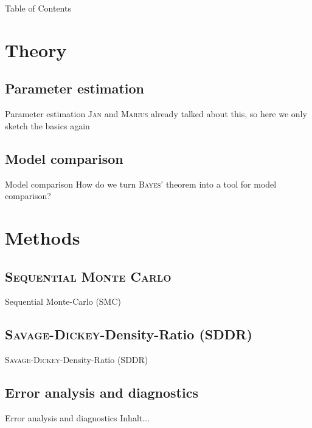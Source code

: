 \documentclass[11pt,aspectratio=1610,dvipsnames]{beamer}
\begin{document}
\begin{frame}{Table of Contents}
	\tableofcontents
\end{frame}

\section{Theory}
\subsection{Parameter estimation}
\begin{frame}{Parameter estimation}
	\textsc{Jan} and \textsc{Marius} already talked about this, so here we only sketch the basics again
\end{frame}

\subsection{Model comparison}
\begin{frame}{Model comparison}
	How do we turn \textsc{Bayes'} theorem into a tool for model comparison?
\end{frame}

\section{Methods}

\subsection{\textsc{Sequential Monte Carlo}}
\begin{frame}{Sequential Monte-Carlo (SMC)}
\end{frame}

\subsection{\textsc{Savage-Dickey}-Density-Ratio (SDDR)}
\begin{frame}{\textsc{Savage-Dickey}-Density-Ratio (SDDR)}
\end{frame}
\subsection{Error analysis and diagnostics}
\begin{frame}{Error analysis and diagnostics}
	Inhalt...
\end{frame}
\end{document}
